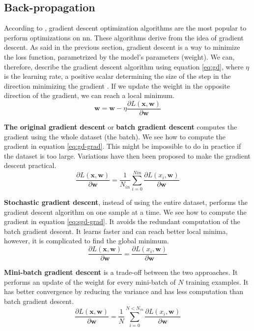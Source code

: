 \subsection{Back-propagation} \label{subs:trainbackward}
According to \textcite{ruder_overview_2017}, gradient descent optimization algorithms are the most popular to perform optimizations on \acrshort{nn}. These algorithms derive from the idea of gradient descent. As said in the previous section, gradient descent is a way to minimize the loss function, parametrized by the model's parameters (weight). We can, therefore, describe the gradient descent algorithm using equation \eqref{eq:gd}, where $\eta$ is the learning rate, a positive scalar determining the size of the step in the direction minimizing the gradient \cite{goodfellow_deep_2016}. If we update the weight in the opposite direction of the gradient, we can reach a local minimum.
%
\begin{equation}
    \boldsymbol{w} = \boldsymbol{w} - \eta \frac{ \partial L( \boldsymbol{x}, \boldsymbol{w} ) }{\partial \boldsymbol{w}}
    \label{eq:gd}
\end{equation}

\textbf{The original gradient descent} or \textbf{batch gradient descent }computes the gradient using the whole dataset (the batch). We see how to compute the gradient in equation \eqref{eq:gd-grad}. This might be impossible to do in practice if the dataset is too large. Variations have then been proposed to make the gradient descent practical.
%
\begin{equation}
    \frac{ \partial L( \boldsymbol{x}, \boldsymbol{w} ) }{\partial \boldsymbol{w}} = \frac{1}{N_{in}} \sum^{Nin}_{i = 0} \frac{ \partial L( x_i, \boldsymbol{w} ) }{\partial \boldsymbol{w}}
    \label{eq:gd-grad}
\end{equation}

\textbf{Stochastic gradient descent}, instead of using the entire dataset, performs the gradient descent algorithm on one sample at a time. We see how to compute the gradient in equation \eqref{eq:sgd-grad}. It avoids the redundant computation of the batch gradient descent. It learns faster and can reach better local minima, however, it is complicated to find the global minimum.
%
\begin{equation}
    \frac{ \partial L( \boldsymbol{x}, \boldsymbol{w} ) }{\partial \boldsymbol{w}} = \frac{ \partial L( x_i, \boldsymbol{w} ) }{\partial \boldsymbol{w}}
    \label{eq:sgd-grad}
\end{equation}

\textbf{Mini-batch gradient descent} is a trade-off between the two approaches. It performs an update of the weight for every mini-batch of $N$ training examples. It has better convergence  by reducing the variance and has less computation than batch gradient descent.
%
\begin{equation}
    \frac{ \partial L( \boldsymbol{x}, \boldsymbol{w} ) }{\partial \boldsymbol{w}} = \frac{1}{N} \sum^{N < N_{in}}_{i = 0} \frac{ \partial L( x_i, \boldsymbol{w} ) }{\partial \boldsymbol{w}}
    \label{eq:bgd-grad}
\end{equation}

